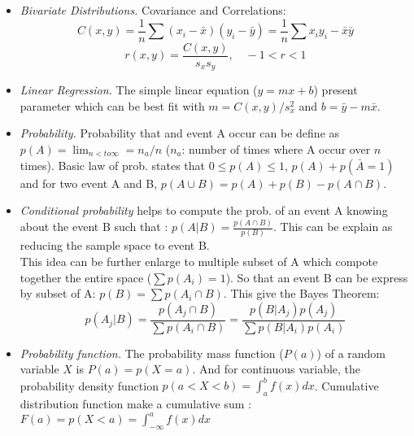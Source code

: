 \documentclass[10pt,landscape]{article}
\begin{document}
\begin{multicols}{3}
\begin{itemize}
\item \emph{Bivariate Distributions.}
Covariance and Correlations:
\[C(x,y)=\frac{1}{n} \sum{(x_i-\bar{x})(y_i-\bar{y})} = \frac{1}{n} \sum{x_i y_i} -\bar{x} \bar{y} \]
\[r(x,y)=\frac{C(x,y)}{s_x s_y}, \quad -1<r<1\]

\item \emph{Linear Regression.} The simple linear equation ($y=mx+b$) present parameter which can be best fit with $m=C(x,y)/s_x^2$ and $b=\bar{y}-m\bar{x}$.

\item \emph{Probability.} Probability that and event A occur can be define as $p(A)=\lim_{n <to \infty}=n_a/n$ ($n_a$: number of times where A occur over $n$ times). Basic law of prob. states that $0\leq p(A) \leq 1$, $p(A)+p(\bar{A}=1)$ and for two event A and B, $p(A \cup B) = p(A) + p(B) -p(A \cap B)$.

\item \emph{Conditional probability} helps to compute the prob. of an event A knowing about the event B such that : $p(A|B)=\frac{p(A \cap B)}{p(B)}$. This can be explain as reducing the sample space to event B. \\
This idea can be further enlarge to multiple subset of A which compote together the entire space ($\sum{p(A_i)}=1$). So that an event B can be express by subset of A: $p(B)=\sum{p(A_i \cap B)}$. This give the Bayes Theorem:
\[p(A_j|B) = \frac{p(A_j \cap B)}{\sum{p(A_i \cap B)}} = \frac{p(B|A_j) p(A_j)}{\sum{p(B | A_i) p(A_i)}}\]

\item \emph{Probability function.} The probability mass function ($P(a)$) of a random variable $X$ is $P(a)=p(X=a)$. And for continuous variable, the probability density function $p(a<X<b)=\int_{a}^{b} f(x) dx$. Cumulative distribution function make a cumulative sum : $F(a)=p(X<a)=\int_{-\infty}^{a} f(x) dx$


\end{itemize}
\end{multicols}
\end{document}

